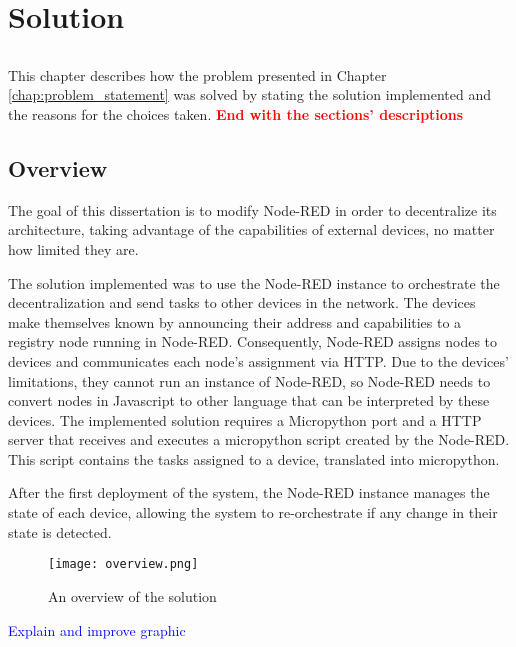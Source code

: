 \chapter{Solution} \label{chap:solution} \minitoc

\section*{}

This chapter describes how the problem presented in Chapter \ref{chap:problem_statement} was solved by stating the solution implemented and the reasons for the choices taken.  \textbf{\textcolor{red}{End with the sections' descriptions}}

\section{Overview}\label{sec:solution_overview}

The goal of this dissertation is to modify Node-RED in order to decentralize its architecture, taking advantage of the capabilities of external devices, no matter how limited they are.

The solution implemented was to use the Node-RED instance to orchestrate the decentralization and send tasks to other devices in the network. The devices make themselves known by announcing their address and capabilities to a registry node running in Node-RED. Consequently, Node-RED assigns nodes to devices and communicates each node's assignment via HTTP. Due to the devices' limitations, they cannot run an instance of Node-RED, so Node-RED needs to convert nodes in Javascript to other language that can be interpreted by these devices. The implemented solution requires a Micropython port and a HTTP server that receives and executes a micropython script created by the Node-RED. This script contains the tasks assigned to a device, translated into micropython. 

After the first deployment of the system, the Node-RED instance manages the state of each device, allowing the system to re-orchestrate if any change in their state is detected.

\begin{figure}[h]
\centering
\texttt{[image: overview.png]}
\caption[Solution's overview]{An overview of the solution}\label{fig:solution_overview}
\end{figure}

\textcolor{blue}{Explain and improve graphic}


